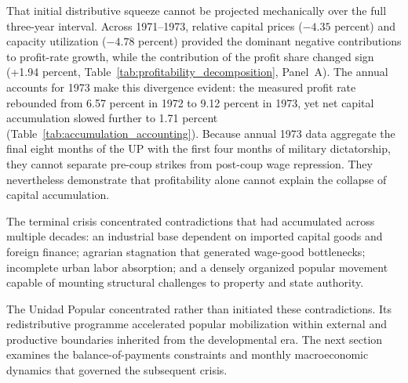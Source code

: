 That initial distributive squeeze cannot be projected mechanically over the full three-year interval. Across 1971--1973, relative capital prices ($-4.35$ percent) and capacity utilization ($-4.78$ percent) provided the dominant negative contributions to profit-rate growth, while the contribution of the profit share changed sign (+1.94 percent, Table~\ref{tab:profitability_decomposition}, Panel~A). The annual accounts for 1973 make this divergence evident: the measured profit rate rebounded from 6.57 percent in 1972 to 9.12 percent in 1973, yet net capital accumulation slowed further to 1.71 percent (Table~\ref{tab:accumulation_accounting}). Because annual 1973 data aggregate the final eight months of the UP with the first four months of military dictatorship, they cannot separate pre-coup strikes from post-coup wage repression. They nevertheless demonstrate that profitability alone cannot explain the collapse of capital accumulation.

The terminal crisis concentrated contradictions that had accumulated across multiple decades: an industrial base dependent on imported capital goods and foreign finance; agrarian stagnation that generated wage-good bottlenecks; incomplete urban labor absorption; and a densely organized popular movement capable of mounting structural challenges to property and state authority.

The Unidad Popular concentrated rather than initiated these contradictions. Its redistributive programme accelerated popular mobilization within external and productive boundaries inherited from the developmental era. The next section examines the balance-of-payments constraints and monthly macroeconomic dynamics that governed the subsequent crisis.



